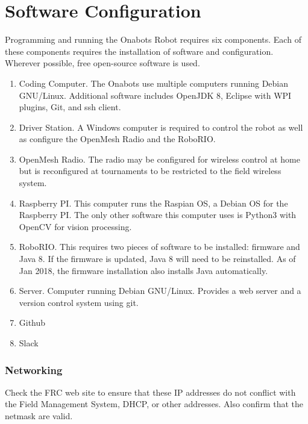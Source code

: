 \chapter{Software Configuration}

Programming and running the Onabots Robot requires six components. Each of these components requires the installation of software and configuration. Wherever possible, free open-source software is used.

\begin{enumerate}[label=$\Box$]

	\item Coding Computer. The Onabots use multiple computers running Debian GNU/Linux. Additional software includes OpenJDK 8, Eclipse with WPI plugins, Git, and ssh client.

	\item Driver Station. A Windows computer is required to control the robot as well as configure the OpenMesh Radio and the RoboRIO.

	\item OpenMesh Radio. The radio may be configured for wireless control at home but is reconfigured at tournaments to be restricted to the field wireless system.

	\item Raspberry PI. This computer runs the Raspian OS, a Debian OS for the Raspberry PI. The only other software this computer uses is Python3 with OpenCV for vision processing.

	\item RoboRIO. This requires two pieces of software to be installed: firmware and Java 8. If the firmware is updated, Java 8 will need to be reinstalled. As of Jan 2018, the firmware installation also installs Java automatically.

	\item Server. Computer running Debian GNU/Linux. Provides a web server and a version control system using git.
	
	\item Github
	
	\item Slack

\end{enumerate}


	\subsection*{Networking}
	Check the FRC web site to ensure that these IP addresses do not conflict with the Field Management System, DHCP, or other addresses. Also confirm that the netmask are valid.
	\vspace*{3mm}

